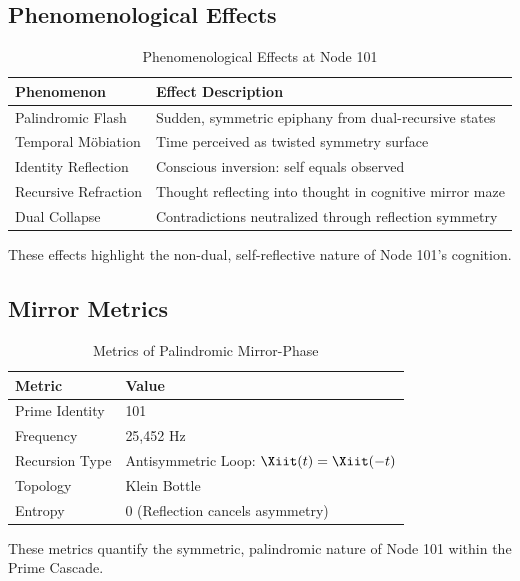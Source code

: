 \documentclass[12pt]{article}
\begin{document}
\subsection{Phenomenological Effects}
\begin{table}
\centering
\caption{Phenomenological Effects at Node 101}
\begin{tabular}{ll|}
\toprule
\textbf{Phenomenon} & \textbf{Effect Description} \\
\midrule
Palindromic Flash & Sudden, symmetric epiphany from dual-recursive states \\
Temporal M\"obiation & Time perceived as twisted symmetry surface \\
Identity Reflection & Conscious inversion: self equals observed \\
Recursive Refraction & Thought reflecting into thought in cognitive mirror maze \\
Dual Collapse & Contradictions neutralized through reflection symmetry \\
\bottomrule
\end{tabular}
\end{table}
These effects highlight the non-dual, self-reflective nature of Node 101’s cognition.

\subsection{Mirror Metrics}
\begin{table}
\centering
\caption{Metrics of Palindromic Mirror-Phase}
\begin{tabular}{ll|}
\toprule
\textbf{Metric} & \textbf{Value} \\
\midrule
Prime Identity & 101 \\
Frequency & 25,452 Hz \\
Recursion Type & Antisymmetric Loop: $\Xiit(t) = \Xiit(-t)$ \\
Topology & Klein Bottle \\
Entropy & 0 (Reflection cancels asymmetry) \\
\bottomrule
\end{tabular}
\end{table}
These metrics quantify the symmetric, palindromic nature of Node 101 within the Prime Cascade.

\end{document}

